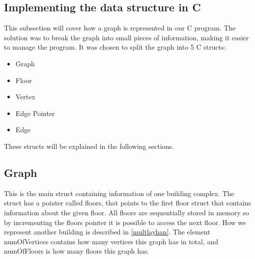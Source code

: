 \begin{minipage}{\linewidth}
\subsection{Implementing the data structure in C}
\label{sub:data_structure}

This subsection will cover how a graph is represented in our C program. The solution was to break the graph into small pieces of information, making it easier to manage the program. It was chosen to split the graph into 5 C structs:


\begin{itemize} [noitemsep]
	\item Graph
	\item Floor
	\item Vertex
	\item Edge Pointer
	\item Edge
\end{itemize}

These structs will be explained in the following sections.
\end{minipage} 

\begin{minipage}{\linewidth}
\subsection{Graph} 
This is the main struct containing information of one building complex. The struct has a pointer called floors, that points to the first floor struct that contains information about the given floor. All floors are sequentially stored in memory so by incrementing the floors pointer it is possible to access the next floor. How we represent another building is described in \cref{multlayhan}. The element numOfVertices contains how many vertices this graph has in total, and numOfFloors is how many floors this graph has.


 \label{Graph_struct}
\end{minipage}

